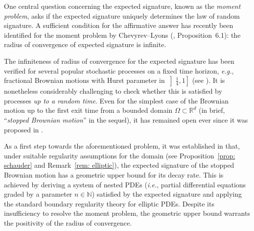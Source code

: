 \documentclass[11pt,a4paper,english,reqno]{amsart}
\theoremstyle{plain}
\newcommand{\R}{\mathbb{R}}
\newcommand{\1}{\mathbbm{1}}
\begin{document}
One central question concerning the expected signature, known as the \emph{moment problem}, asks if the expected signature uniquely determines the law of random signature. A sufficient condition for the affirmative answer has recently been identified for the moment problem by Chevyrev--Lyons (\cite{cl}, Proposition~6.1): the radius of convergence of expected signature is infinite. %



The infiniteness of radius of convergence for the expected signature has been verified for several popular stochastic processes on a fixed time horizon, \emph{e.g.}, fractional Brownian motions with Hurst parameter in $\left]\frac{1}{4}, 1\right]$ (see \cite{cl, passeggeri2016some}). It is nonetheless considerably challenging to check whether this is satisfied by processes \emph{up to a random time}. Even for the simplest case of the Brownian motion up to the first exit time from a bounded domain $\Omega \subset \R^d$ (in brief, ``\emph{stopped Brownian motion}'' in the sequel), it has remained open ever since it was proposed in \cite{lyons2015expected}. 

As a first step towards the aforementioned problem, it was established in \cite{lyons2015expected} that, under suitable regularity assumptions for the domain (see Proposition~\ref{prop: schauder} and Remark~\ref{rem: elliptic}), the expected signature of the stopped Brownian motion has a geometric upper bound for its decay rate. This is achieved by deriving a system of nested PDEs  (\emph{i.e.}, partial differential equations graded by a parameter $n 
\in \mathbb{N}$) satisfied by the expected signature and applying the standard boundary regularity theory for elliptic PDEs. Despite its insufficiency to resolve the moment problem, the geometric upper bound warrants the positivity of the radius of convergence. 
\end{document}

